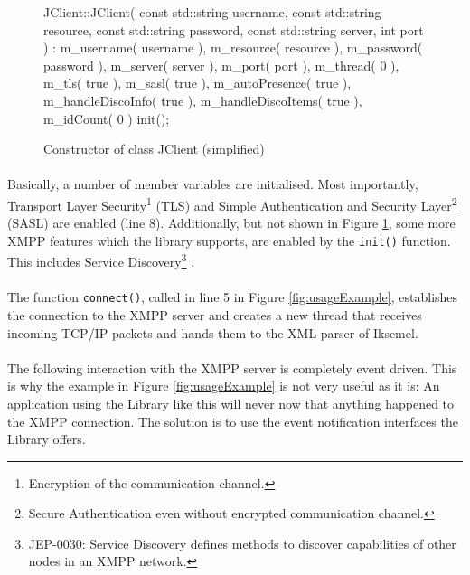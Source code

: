 \begin{figure}[H]
\begin{listing}{1}
JClient::JClient( const std::string username,
                  const std::string resource,
                  const std::string password,
                  const std::string server, int port )
  : m_username( username ), m_resource( resource ),
    m_password( password ), m_server( server ),
    m_port( port ), m_thread( 0 ),
    m_tls( true ), m_sasl( true ),
    m_autoPresence( true ), m_handleDiscoInfo( true ),
    m_handleDiscoItems( true ), m_idCount( 0 )
{
  init();
}
\end{listing}
\caption{Constructor of class JClient (simplified)}
\label{fig:JClientConstructor}
\end{figure}

\paragraph{}
Basically, a number of member variables are initialised. Most importantly, Transport Layer Security\footnote{Encryption of the communication channel.} (TLS) \cite{rfc2246} and Simple Authentication and Security Layer\footnote{Secure Authentication even without encrypted communication channel.} (SASL) \cite{rfc2222} are enabled (line 8). Additionally, but not shown in Figure \ref{fig:JClientConstructor}, some more XMPP features which the library supports, are enabled by the \texttt{init()} function. This includes Service Discovery\footnote{JEP-0030: Service Discovery defines methods to discover capabilities of other nodes in an XMPP network.} \cite{jep0030}.

\paragraph{}
The function \texttt{connect()}, called in line 5 in Figure \ref{fig:usageExample}, establishes the connection to the XMPP server and creates a new thread that receives incoming TCP/IP packets and hands them to the XML parser of Iksemel.

\paragraph{}
The following interaction with the XMPP server is completely event driven. This is why the example in Figure \ref{fig:usageExample} is not very useful as it is: An application using the Library like this will never now that anything happened to the XMPP connection. The solution is to use the event notification interfaces the Library offers.

